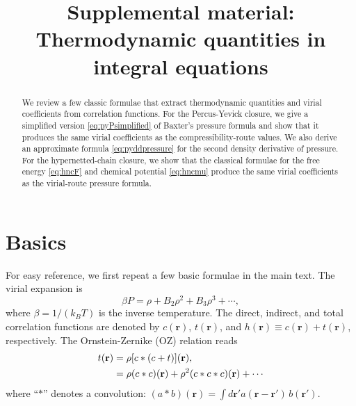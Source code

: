 \documentclass[preprint]{revtex4-1}
\newcommand{\vct}[1]{\mathbf{#1}}
\providecommand{\vr}{} %
\renewcommand{\vr}{\vct{r}}
\begin{document}
\title{Supplemental material: Thermodynamic quantities in integral equations}

\begin{abstract}
We review a few classic formulae that extract thermodynamic quantities
  and virial coefficients from correlation functions.
%
For the Percus-Yevick closure,
  we give a simplified version \eqref{eq:pyPsimplified}
  of Baxter's pressure formula
  and show that it produces the same virial coefficients
  as the compressibility-route values.
%
We also derive an approximate formula \eqref{eq:pyddpressure}
  for the second density derivative of pressure.
%
For the hypernetted-chain closure,
  we show that the classical formulae
  for the free energy \eqref{eq:hncF}
  and chemical potential \eqref{eq:hncmu}
  produce the same virial coefficients
  as the virial-route pressure formula.
\end{abstract}

\maketitle






\section{Basics}

For easy reference,
we first repeat a few basic formulae in the main text.
%
The virial expansion is
%
\begin{equation}
  \beta P = \rho + B_2 \rho^2 + B_3 \rho^3 + \cdots,
\label{eq:virial}
\end{equation}
%
where $\beta = 1/(k_B T)$ is the inverse temperature.
%
The direct, indirect, and total correlation functions
  are denoted by $c(\vr)$, $t(\vr)$,
  and $h(\vr) \equiv c(\vr) + t(\vr)$,
  respectively.
%
The Ornstein-Zernike (OZ) relation\cite{hansen} reads
%
\begin{align}
  t(\vr) &= \rho [c * (c + t)](\vr), \notag \\
         &= \rho (c*c)(\vr) + \rho^2 (c*c*c)(\vr) + \cdots
\label{eq:oz}
\end{align}
%
where ``$*$'' denotes a convolution:
  $(a * b)(\vr) = \int d\vr' a(\vr - \vr') \, b(\vr')$.
%
\end{document}
